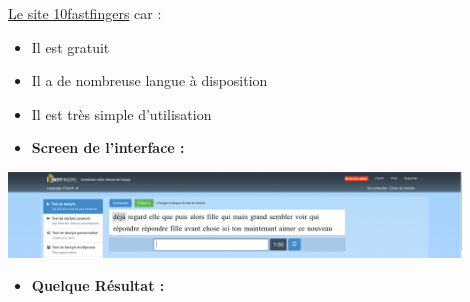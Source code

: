 \documentclass[12pt]{article}
\begin{document}
\vspace{0.3cm}
\href{https://10fastfingers.com/typing-test/french#}{Le site 10fastfingers} car :
 \vspace{0.3cm}
		\begin{itemize}
      \begin{itemize}
			  \item Il est gratuit
			  \item Il a de nombreuse langue à disposition
			  \item Il est très simple d'utilisation
      \end{itemize}
		\end{itemize}

\vspace{0.3cm}
\begin{itemize}
  \item \textbf{Screen de l'interface :}
\end{itemize}
\vspace{0.3cm}

\begin{center}
  \includegraphics[width=12cm]{screen-10fastfingers.png}
\end{center}

\vspace{0.3cm}
\begin{itemize}
  \item \textbf{Quelque Résultat :}
\end{itemize}
\end{document}
